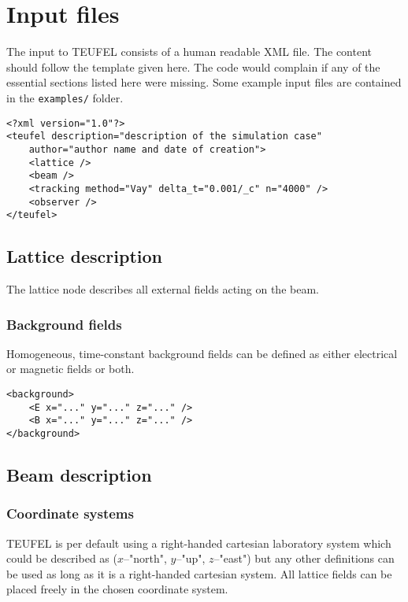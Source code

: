 \documentclass[11pt]{article}
\begin{document}
\section{Input files}

The input to TEUFEL consists of a human readable XML file. The content should follow
the template given here. The code would complain if any of the essential sections
listed here were missing. Some example input files are contained in the \verb|examples/| folder.

\begin{lstlisting}
<?xml version="1.0"?>
<teufel description="description of the simulation case"
    author="author name and date of creation">
    <lattice />
    <beam />
    <tracking method="Vay" delta_t="0.001/_c" n="4000" />
    <observer />
</teufel>
\end{lstlisting}

\subsection{Lattice description}

The lattice node describes all external fields acting on the beam.

\subsubsection{Background fields}
Homogeneous, time-constant background fields can be defined as either electrical or magnetic
fields or both.
\begin{lstlisting}
<background>
    <E x="..." y="..." z="..." />
    <B x="..." y="..." z="..." />
</background>
\end{lstlisting}


\subsection{Beam description}

\subsubsection{Coordinate systems}

TEUFEL is per default using a right-handed cartesian laboratory system which could be described
as ($x$--"north", $y$--"up", $z$--"east") but any other definitions can be used as long as it is
a right-handed cartesian system. All lattice fields can be placed freely in the chosen coordinate system.
\end{document}
